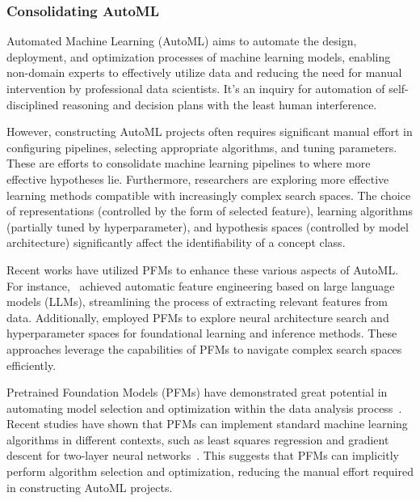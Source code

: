   
  
  \subsubsection{Consolidating AutoML}\label{sec:consolidate_automl}
  
  Automated Machine Learning (AutoML) aims to automate the design, deployment, and optimization processes of machine learning models, enabling non-domain experts to effectively utilize data and reducing the need for manual intervention by professional data scientists. It's an inquiry for automation of self-disciplined reasoning and decision plans with the least human interference.
  
  However, constructing AutoML projects often requires significant manual effort in configuring pipelines, selecting appropriate algorithms, and tuning parameters. These are efforts to consolidate machine learning pipelines to where more effective hypotheses lie. Furthermore, researchers are exploring more effective learning methods compatible with increasingly complex search spaces. The choice of representations (controlled by the form of selected feature), learning algorithms (partially tuned by hyperparameter), and hypothesis spaces (controlled by model architecture) significantly affect the identifiability of a concept class.
  
  Recent works have utilized PFMs to enhance these various aspects of AutoML. For instance,~\cite{Hollmann2023LargeLM} achieved automatic feature engineering based on large language models (LLMs), streamlining the process of extracting relevant features from data. Additionally,\cite{sayed2024gizaml} employed PFMs to explore neural architecture search and hyperparameter spaces for foundational learning and inference methods. These approaches leverage the capabilities of PFMs to navigate complex search spaces efficiently.
  
  Pretrained Foundation Models (PFMs) have demonstrated great potential in automating model selection and optimization within the data analysis process~\cite{liu2023jarvix}. Recent studies have shown that PFMs can implement standard machine learning algorithms in different contexts, such as least squares regression and gradient descent for two-layer neural networks~\cite{bai2024transformers}. This suggests that PFMs can implicitly perform algorithm selection and optimization, reducing the manual effort required in constructing AutoML projects.
  
  
  
